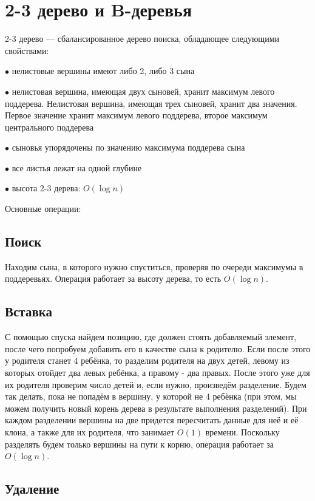 \section{2-3 дерево и B-деревья}

2-3 дерево — сбалансированное дерево поиска, обладающее следующими свойствами:

$\bullet$ нелистовые вершины имеют либо 2, либо 3 сына

$\bullet$ нелистовая вершина, имеющая двух сыновей, хранит максимум левого поддерева. Нелистовая вершина, имеющая трех сыновей, хранит два значения. Первое значение хранит максимум левого поддерева, второе максимум центрального поддерева

$\bullet$ сыновья упорядочены по значению максимума поддерева сына

$\bullet$ все листья лежат на одной глубине

$\bullet$ высота 2-3 дерева: $O(\log n)$

Основные операции:

\subsection{Поиск}

Находим сына, в которого нужно спуститься, проверяя по очереди максимумы в поддеревьях. Операция работает за высоту дерева, то есть $O(\log n)$.

\subsection{Вставка}

С помощью спуска найдем позицию, где должен стоять добавляемый элемент, после чего попробуем добавить его в качестве сына к родителю. Если после этого у родителя станет 4 ребёнка, то разделим родителя на двух детей, левому из которых отойдет два левых ребёнка, а правому - два правых. После этого уже для их родителя проверим число детей и, если нужно, произведём разделение. Будем так делать, пока не попадём в вершину, у которой не 4 ребёнка (при этом, мы можем получить новый корень дерева в результате выполнения разделений). При каждом разделении вершины на две придется пересчитать данные для неё и её клона, а также для их родителя, что занимает $O(1)$ времени. Поскольку разделять будем только вершины на пути к корню, операция работает за $O(\log n)$.

\subsection{Удаление}


